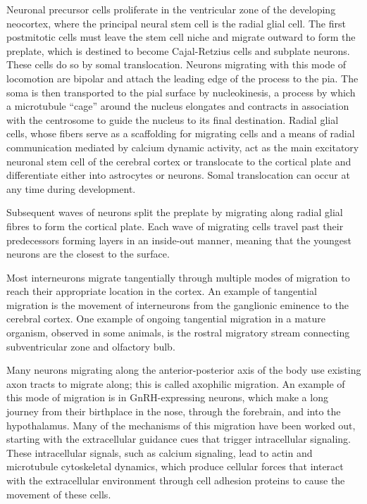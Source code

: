 Neuronal precursor cells proliferate in the ventricular zone of the developing neocortex, where the principal neural stem cell is the radial glial cell. The first postmitotic cells must leave the stem cell niche and migrate outward to form the preplate, which is destined to become Cajal-Retzius cells and subplate neurons. These cells do so by somal translocation. Neurons migrating with this mode of locomotion are bipolar and attach the leading edge of the process to the pia. The soma is then transported to the pial surface by nucleokinesis, a process by which a microtubule ``cage'' around the nucleus elongates and contracts in association with the centrosome to guide the nucleus to its final destination. Radial glial cells, whose fibers serve as a scaffolding for migrating cells and a means of radial communication mediated by calcium dynamic activity, act as the main excitatory neuronal stem cell of the cerebral cortex or translocate to the cortical plate and differentiate either into astrocytes or neurons. Somal translocation can occur at any time during development.

Subsequent waves of neurons split the preplate by migrating along radial glial fibres to form the cortical plate. Each wave of migrating cells travel past their predecessors forming layers in an inside-out manner, meaning that the youngest neurons are the closest to the surface.

Most interneurons migrate tangentially through multiple modes of migration to reach their appropriate location in the cortex. An example of tangential migration is the movement of interneurons from the ganglionic eminence to the cerebral cortex. One example of ongoing tangential migration in a mature organism, observed in some animals, is the rostral migratory stream connecting subventricular zone and olfactory bulb.

Many neurons migrating along the anterior-posterior axis of the body use existing axon tracts to migrate along; this is called axophilic migration. An example of this mode of migration is in GnRH-expressing neurons, which make a long journey from their birthplace in the nose, through the forebrain, and into the hypothalamus. Many of the mechanisms of this migration have been worked out, starting with the extracellular guidance cues that trigger intracellular signaling. These intracellular signals, such as calcium signaling, lead to actin and microtubule cytoskeletal dynamics, which produce cellular forces that interact with the extracellular environment through cell adhesion proteins to cause the movement of these cells.

